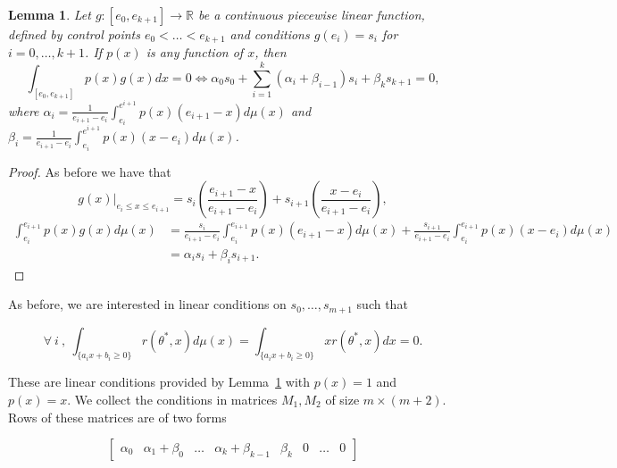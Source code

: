 \documentclass{article}
\newtheorem{lemma}[theorem]{Lemma}
\newcommand{\RR}{\mathbb{R}}
\begin{document}
\begin{lemma}\label{lemma:coeffs_general} Let $g: [e_0,e_{k+1}] \rightarrow
\RR$ be a continuous piecewise linear function, defined by control points $e_0
< \ldots < e_{k+1}$ and conditions $g(e_i) = s_i$ for $i=0,\ldots,k+1$. If
$p(x)$ is any function of $x$, then
\begin{equation}
\int_{[e_0,e_{k+1}]} p(x) g(x) dx = 0 \Leftrightarrow \alpha_0 s_0 + \sum_
{i=1}^k (\alpha_i + \beta_{i-1})s_i + \beta_k s_{k+1} = 0,
\end{equation}
where $\alpha_i = \frac{1}{e_{i+1}-e_i} \int_{e_i}^{e^{i+1}} p(x)(e_{i+1} - x)
d\mu (x)$ and $\beta_i = \frac{1}{e_{i+1}-e_i} \int_{e_i}^{e^{i+1}} p(x)(x -
e_i) d\mu (x)$.
\end{lemma}
\begin{proof} As before we have that
\begin{equation}
g(x)|_{e_i \le x \le e_{i+1}} = s_{i} \left(\frac{e_{i+1} - x}{e_
{i+1}-e_i}\right)
+ s_ {i+1} \left(\frac{x- e_i}{e_
{i+1}-e_i} \right),
\end{equation}
\begin{equation}
\begin{aligned}
\int_{e_i}^{e_{i+1}} p(x) g(x) d\mu(x) &= \frac{s_i}{e_
{i+1}-e_i} \int_{e_i}^{e_{i+1}} p(x)(e_{i+1} - x) d \mu(x) +
\frac{s_{i+1}}{e_{i+1}-e_i} \int_{e_i}^{e_{i+1}} p(x)(x - e_i) d \mu(x)\\[.4cm]
& = \alpha_i s_i + \beta_i s_{i+1}.
\end{aligned}
\end{equation}
\end{proof}

As before, we are interested in linear conditions on $s_0,\ldots,s_{m+1}$ such
that

\begin{equation}\label{eq:integral_conditions_2}
\forall~i~,~\int_{\{a_i x + b_i \ge 0\}} r(\theta^*,x) d\mu(x) = \int_
{\{a_i x + b_i
\ge 0\}} x r
(\theta^*,x) dx = 0.
\end{equation}

These are linear conditions provided by Lemma~\ref{lemma:coeffs_general} with
$p(x) = 1$ and $p(x) = x$. We collect the conditions in matrices $M_1, M_2$ of
size $m \times (m+2)$. Rows of these matrices are of two forms

\[
\begin{bmatrix}
    \alpha_0 & \alpha_1 + \beta_0 & \ldots & \alpha_k + \beta_{k-1} & \beta_k &
    0 & \ldots &0
\end{bmatrix}
\]
\end{document}
